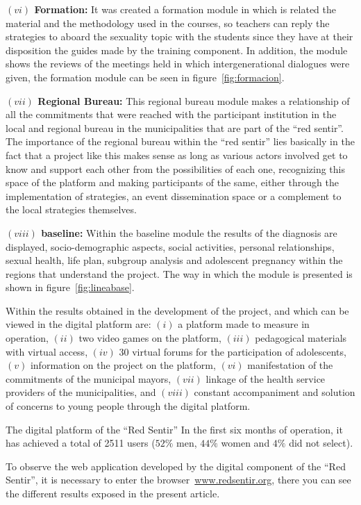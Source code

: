 \documentclass[journal,transmag]{IEEEtran}
\begin{document}
\textbf{$(vi)$ Formation:} It was created a formation module in which is related the material and the methodology used in the courses, so teachers can reply the strategies to aboard the sexuality topic with the students since they have at their disposition the guides made by the training component. In addition, the module shows the reviews of the meetings held in which intergenerational dialogues were given, the formation module can be seen in figure~\ref{fig:formacion}.

\textbf{$(vii)$ Regional Bureau:} This regional bureau module makes a relationship of all the commitments that were reached with the participant institution in the local and regional bureau in the municipalities that are part of the ``red sentir''. The importance of the regional bureau within the ``red sentir'' lies basically in the fact that a project like this makes sense as long as various actors involved get to know and support each other from the possibilities of each one, recognizing this space of the platform and making participants of the same, either through the implementation of strategies, an event dissemination space or a complement to the local strategies themselves.

\textbf{$(viii)$ baseline:} Within the baseline module the results of the diagnosis are displayed, socio-demographic aspects, social activities, personal relationships, sexual health, life plan, subgroup analysis and adolescent pregnancy within the regions that understand the project. The way in which the module is presented is shown in figure~\ref{fig:lineabase}.

Within the results obtained in the development of the project, and which can be viewed in the digital platform are: $(i)$ a platform made to measure in operation, $(ii)$ two video games on the platform, $(iii)$ pedagogical materials with virtual access, $(iv)$ $30$ virtual forums for the participation of adolescents, $(v)$ information on the project on the platform, $(vi)$ manifestation of the commitments of the municipal mayors, $(vii)$ linkage of the health service providers of the municipalities, and $(viii)$ constant accompaniment and solution of concerns to young people through the digital platform.

The digital platform of the ``Red Sentir” In the first six months of operation, it has achieved a total of 2511 users ($52\%$ men, $44\%$ women and $4\%$ did not select).

To observe the web application developed by the digital component of the ``Red Sentir'', it is necessary to enter the browser~\url{www.redsentir.org}, there you can see the different results exposed in the present article.
\end{document}
